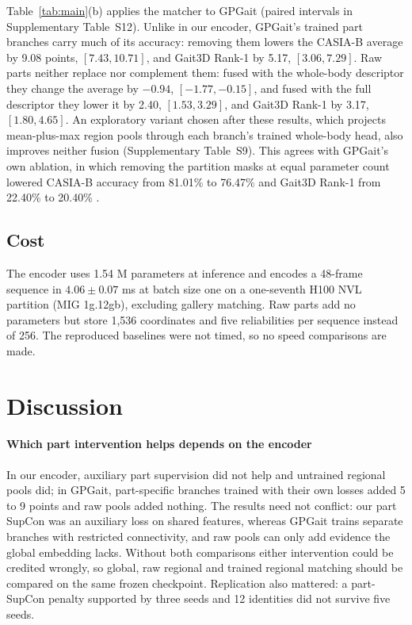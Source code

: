 \documentclass[journal]{IEEEtran}
\begin{document}
Table~\ref{tab:main}(b) applies the matcher to GPGait (paired intervals in
Supplementary Table~S12). Unlike in our encoder, GPGait's trained part branches
carry much of its accuracy: removing them lowers the CASIA-B average by 9.08
points, $[7.43,10.71]$, and Gait3D Rank-1 by 5.17, $[3.06,7.29]$. Raw parts
neither replace nor complement them: fused with the whole-body descriptor they
change the average by $-0.94$, $[-1.77,-0.15]$, and fused with the full
descriptor they lower it by 2.40, $[1.53,3.29]$, and Gait3D Rank-1 by 3.17,
$[1.80,4.65]$. An exploratory variant chosen after these results, which projects
mean-plus-max region pools through each branch's trained whole-body head, also
improves neither fusion (Supplementary Table~S9). This agrees with GPGait's own
ablation, in which removing the partition masks at equal parameter count
lowered CASIA-B accuracy from 81.01\% to 76.47\% and Gait3D Rank-1 from 22.40\%
to 20.40\% \cite{fu2023gpgait}.

\subsection{Cost}

The encoder uses 1.54 M parameters at inference and encodes a 48-frame sequence
in $4.06\pm0.07$ ms at batch size one on a one-seventh H100 NVL partition (MIG
1g.12gb), excluding gallery matching. Raw parts add no parameters but store
1,536 coordinates and five reliabilities per sequence instead of 256. The
reproduced baselines were not timed, so no speed comparisons are made.

\section{Discussion}
\label{sec:discussion}

\paragraph{Which part intervention helps depends on the encoder}
In our encoder, auxiliary part supervision did not help and untrained regional
pools did; in GPGait, part-specific branches trained with their own losses
added 5 to 9 points and raw pools added nothing. The results need not conflict:
our part SupCon was an auxiliary loss on shared features, whereas GPGait trains
separate branches with restricted connectivity, and raw pools can only add
evidence the global embedding lacks. Without both comparisons either intervention
could be credited wrongly, so global, raw regional and trained regional matching
should be compared on the same frozen checkpoint. Replication also mattered: a
part-SupCon penalty supported by three seeds and 12 identities did not survive
five seeds.
\end{document}
